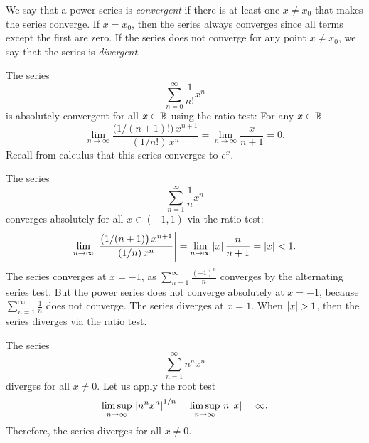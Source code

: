 We say that a power series is
\emph{convergent} if
there is at least one $x \not= x_0$ that makes the series converge.
If $x=x_0$, then the series always
converges since all terms except the first are zero.
If the series does not converge for any point $x \not= x_0$, we say that
the series is \emph{divergent}.

\begin{example} \label{ps:expex}
The series
\begin{equation*}
\sum_{n=0}^\infty \frac{1}{n!} x^n
\end{equation*}
is absolutely convergent for all $x \in {\mathbb{R}}$ using the ratio test:
For any $x \in {\mathbb{R}}$
\begin{equation*}
\lim_{n \to \infty}
\frac{\bigl(1/(n+1)!\bigr) \, x^{n+1}}{(1/n!) \, x^{n}}
=
\lim_{n \to \infty}
\frac{x}{n+1}
=
0.
\end{equation*}
Recall from calculus that this series converges to $e^x$.
\end{example}

\begin{example} \label{ps:1kex}
The series
\begin{equation*}
\sum_{n=1}^\infty \frac{1}{n} x^n
\end{equation*}
converges absolutely for all $x \in (-1,1)$ via the ratio test:
\begin{equation*}
\lim_{n \to \infty}
\left\lvert {
\frac{\bigl(1/(n+1) \bigr) \, x^{n+1}}{(1/n) \, x^{n}}
} \right\rvert
=
\lim_{n \to \infty}
\left\lvert {x} \right\rvert \frac{n}{n+1}
=
\left\lvert {x} \right\rvert < 1 .
\end{equation*}
The series converges at $x=-1$,
as
$\sum_{n=1}^\infty \frac{{(-1)}^n}{n}$ converges
by the alternating series
test.
But the power series does not converge absolutely at $x=-1$, because
$\sum_{n=1}^\infty \frac{1}{n}$ does not converge.
The series
diverges at $x=1$.
When $\left\lvert {x} \right\rvert > 1$, then the series diverges via the ratio test.
\end{example}

\begin{example} \label{ps:divergeex}
The series
\begin{equation*}
\sum_{n=1}^\infty n^n x^n
\end{equation*}
diverges for all $x \not= 0$.  Let us apply the root test
\begin{equation*}
\limsup_{n\to\infty}
\,
\left\lvert {n^n x^n} \right\rvert^{1/n}
=
\limsup_{n\to\infty}
\,
n \left\lvert {x} \right\rvert
= \infty .
\end{equation*}
Therefore, the series diverges for all $x \not= 0$.
\end{example}

